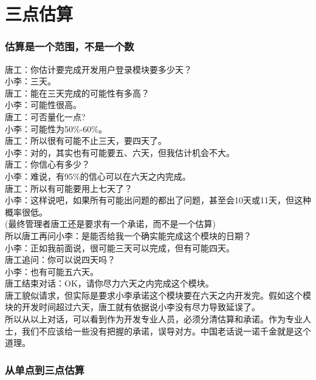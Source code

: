 \chapter{三点估算} %

\hypertarget{ux4f30ux7b97ux662fux4e00ux4e2aux8303ux56f4ux4e0dux662fux4e00ux4e2aux6570}{%
\subsection{估算是一个范围，不是一个数}\label{ux4f30ux7b97ux662fux4e00ux4e2aux8303ux56f4ux4e0dux662fux4e00ux4e2aux6570}}

唐工：你估计要完成开发用户登录模块要多少天？\\
小李：三天。\\
唐工：能在三天完成的可能性有多高？\\
小李：可能性很高。\\
唐工：可否量化一点?\\
小李：可能性为50\%-60\%。\\
唐工：所以很有可能不止三天，要四天了。\\
小李：对的，其实也有可能要五、六天，但我估计机会不大。\\
唐工：你信心有多少？\\
小李：难说，有95\%的信心可以在六天之内完成。\\
唐工：所以有可能要用上七天了？\\
小李：这样说吧，如果所有可能出问题的都出了问题，甚至会10天或11天，但这种概率很低。\\
(最终管理者唐工还是要求有一个承诺，而不是一个估算)\\
所以唐工再问小李：是能否给我一个确实能完成这个模块的日期？\\
小李：正如我前面说，很可能三天可以完成，但有可能四天。\\
唐工追问：你可以说四天吗？\\
小李：也有可能五六天。\\
唐工结束对话：OK，请你尽力六天之内完成这个模块。\\
唐工貌似请求，但实际是要求小李承诺这个模块要在六天之内开发完。假如这个模块的开发时间超过六天，唐工就有依据说小李没有尽力导致延误了。\\
所以从以上对话，可以看到作为开发专业人员，必须分清估算和承诺。作为专业人士，我们不应该给一些没有把握的承诺，误导对方。中国老话说一诺千金就是这个道理。

\hypertarget{ux4eceux5355ux70b9ux5230ux4e09ux70b9ux4f30ux7b97}{%
\subsection{从单点到三点估算}\label{ux4eceux5355ux70b9ux5230ux4e09ux70b9ux4f30ux7b97}}

